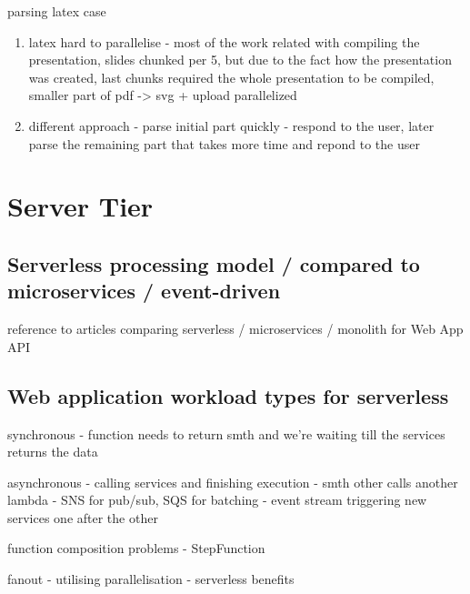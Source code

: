     

parsing latex case

\begin{enumerate}
    \item latex hard to parallelise - most of the work related with compiling the presentation, slides chunked per 5, but due to the fact how the presentation was created, last chunks required the whole presentation to be compiled, smaller part of pdf -> svg + upload parallelized
    \item different approach - parse initial part quickly - respond to the user, later parse the remaining part that takes more time and repond to the user
\end{enumerate}

\section{Server Tier}

\subsection{Serverless processing model / compared to microservices / event-driven}


reference to articles comparing serverless / microservices / monolith for Web App API

\subsection{Web application workload types for serverless}


synchronous - function needs to return smth and we're waiting till the services returns the data

asynchronous - calling services and finishing execution - smth other calls another lambda - SNS for pub/sub, SQS for batching - event stream triggering new services one after the other

function composition problems - StepFunction

fanout - utilising parallelisation - serverless benefits


